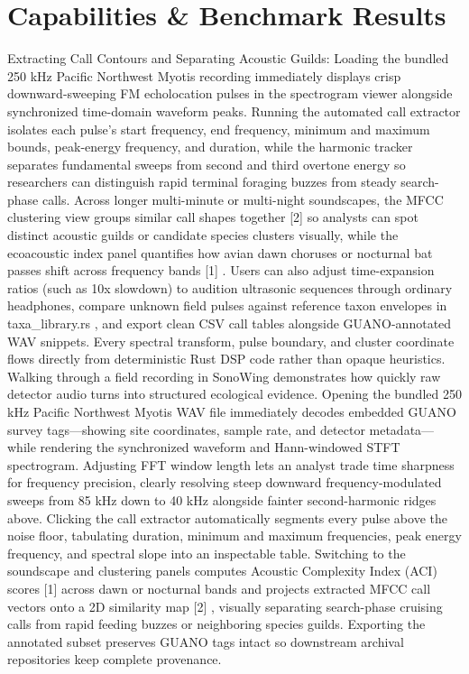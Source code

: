 \documentclass[10pt,letterpaper]{article}
\begin{document}
\section{Capabilities \& Benchmark Results}
Extracting Call Contours and Separating Acoustic Guilds: Loading the bundled 250 kHz Pacific Northwest Myotis recording immediately displays crisp downward-sweeping FM echolocation pulses in the spectrogram viewer alongside synchronized time-domain waveform peaks. Running the automated call extractor isolates each pulse's start frequency, end frequency, minimum and maximum bounds, peak-energy frequency, and duration, while the harmonic tracker separates fundamental sweeps from second and third overtone energy so researchers can distinguish rapid terminal foraging buzzes from steady search-phase calls. Across longer multi-minute or multi-night soundscapes, the MFCC clustering view groups similar call shapes together [2] so analysts can spot distinct acoustic guilds or candidate species clusters visually, while the ecoacoustic index panel quantifies how avian dawn choruses or nocturnal bat passes shift across frequency bands [1] . Users can also adjust time-expansion ratios (such as 10x slowdown) to audition ultrasonic sequences through ordinary headphones, compare unknown field pulses against reference taxon envelopes in taxa\_library.rs , and export clean CSV call tables alongside GUANO-annotated WAV snippets. Every spectral transform, pulse boundary, and cluster coordinate flows directly from deterministic Rust DSP code rather than opaque heuristics. Walking through a field recording in SonoWing demonstrates how quickly raw detector audio turns into structured ecological evidence. Opening the bundled 250 kHz Pacific Northwest Myotis WAV file immediately decodes embedded GUANO survey tags---showing site coordinates, sample rate, and detector metadata---while rendering the synchronized waveform and Hann-windowed STFT spectrogram. Adjusting FFT window length lets an analyst trade time sharpness for frequency precision, clearly resolving steep downward frequency-modulated sweeps from 85 kHz down to 40 kHz alongside fainter second-harmonic ridges above. Clicking the call extractor automatically segments every pulse above the noise floor, tabulating duration, minimum and maximum frequencies, peak energy frequency, and spectral slope into an inspectable table. Switching to the soundscape and clustering panels computes Acoustic Complexity Index (ACI) scores [1] across dawn or nocturnal bands and projects extracted MFCC call vectors onto a 2D similarity map [2] , visually separating search-phase cruising calls from rapid feeding buzzes or neighboring species guilds. Exporting the annotated subset preserves GUANO tags intact so downstream archival repositories keep complete provenance.
\end{document}
